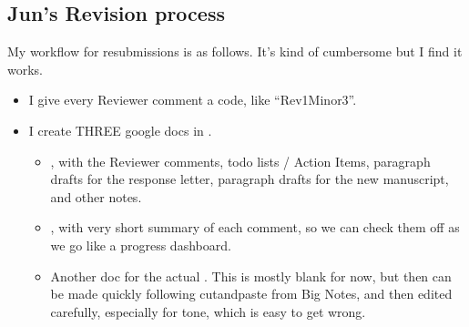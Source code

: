 \documentclass[letterpaper,10pt,english]{sphinxmanual}
\begin{document}
\subsection{Jun’s Revision process}
\label{\detokenize{PaperWritingTips:jun-s-revision-process}}
\sphinxAtStartPar
My workflow for resubmissions is as follows. It’s kind of cumbersome but I find it works.
\begin{itemize}
\item {} 
\sphinxAtStartPar
I give every Reviewer comment a code, like “Rev1Minor3”.

\item {} 
\sphinxAtStartPar
I create THREE google docs in .
\begin{itemize}
\item {} 
\sphinxAtStartPar
{}, with the Reviewer comments, todo lists / Action Items, paragraph drafts for the response letter, paragraph drafts for the new manuscript, and other notes.

\item {} 
\sphinxAtStartPar
{}, with very short summary of each comment, so we can check them off as we go \textendash{} like a progress dashboard.

\item {} 
\sphinxAtStartPar
Another doc for the actual . This is mostly blank for now, but then can be made quickly following cut\sphinxhyphen{}and\sphinxhyphen{}paste from Big Notes, and then edited carefully, especially for tone, which is easy to get wrong.

\end{itemize}

\end{itemize}
\end{document}
